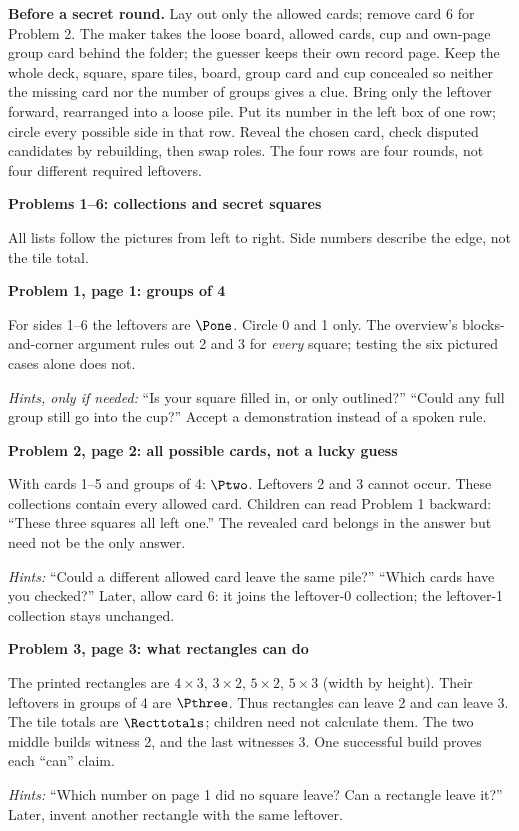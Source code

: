 \documentclass[11pt]{article}
\newcommand{\head}[1]{\par\textbf{\large #1}\par}
\newcommand{\sub}[1]{\par\textbf{#1}\par}
\begin{document}
\textbf{Before a secret round.} Lay out only the allowed cards; remove card 6 for Problem 2. The maker takes the loose board, allowed cards, cup and own-page group card behind the folder; the guesser keeps their own record page. Keep the whole deck, square, spare tiles, board, group card and cup concealed so neither the missing card nor the number of groups gives a clue. Bring only the leftover forward, rearranged into a loose pile. Put its number in the left box of one row; circle every possible side in that row. Reveal the chosen card, check disputed candidates by rebuilding, then swap roles. The four rows are four rounds, not four different required leftovers.

\newpage
\head{Problems 1--6: collections and secret squares}
All lists follow the pictures from left to right. Side numbers describe the edge, not the tile total.

\sub{Problem 1, page 1: groups of 4}
For sides 1--6 the leftovers are $\Pone$. Circle 0 and 1 only. The overview's blocks-and-corner argument rules out 2 and 3 for \emph{every} square; testing the six pictured cases alone does not.

\textit{Hints, only if needed:} ``Is your square filled in, or only outlined?'' ``Could any full group still go into the cup?'' Accept a demonstration instead of a spoken rule.

\sub{Problem 2, page 2: all possible cards, not a lucky guess}
With cards 1--5 and groups of 4: $\Ptwo$. Leftovers 2 and 3 cannot occur. These collections contain every allowed card. Children can read Problem 1 backward: ``These three squares all left one.'' The revealed card belongs in the answer but need not be the only answer.

\textit{Hints:} ``Could a different allowed card leave the same pile?'' ``Which cards have you checked?'' Later, allow card 6: it joins the leftover-0 collection; the leftover-1 collection stays unchanged.

\sub{Problem 3, page 3: what rectangles can do}
The printed rectangles are $4\times3$, $3\times2$, $5\times2$, $5\times3$ (width by height). Their leftovers in groups of 4 are $\Pthree$. Thus rectangles can leave 2 and can leave 3. The tile totals are $\Recttotals$; children need not calculate them. The two middle builds witness 2, and the last witnesses 3. One successful build proves each ``can'' claim.

\textit{Hints:} ``Which number on page 1 did no square leave? Can a rectangle leave it?'' Later, invent another rectangle with the same leftover.
\end{document}
